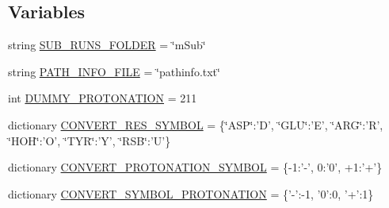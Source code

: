 \subsection*{Variables}
\begin{DoxyCompactItemize}
\item 
string \hyperlink{namespacearg82__conn_a1118fc69bf72cf5c0c6af8860ac1ac98}{S\-U\-B\-\_\-\-R\-U\-N\-S\-\_\-\-F\-O\-L\-D\-E\-R} = \char`\"{}m\-Sub\char`\"{}
\item 
string \hyperlink{namespacearg82__conn_ad6e38f362ded631c94bea165ee760673}{P\-A\-T\-H\-\_\-\-I\-N\-F\-O\-\_\-\-F\-I\-L\-E} = \char`\"{}pathinfo.\-txt\char`\"{}
\item 
int \hyperlink{namespacearg82__conn_a7f9b0ba0df45cb729820b40149d23b2d}{D\-U\-M\-M\-Y\-\_\-\-P\-R\-O\-T\-O\-N\-A\-T\-I\-O\-N} = 211
\item 
dictionary \hyperlink{namespacearg82__conn_ac3320beedaddd48f95e875b543d3a177}{C\-O\-N\-V\-E\-R\-T\-\_\-\-R\-E\-S\-\_\-\-S\-Y\-M\-B\-O\-L} = \{\char`\"{}A\-S\-P\char`\"{}\-:'D', \char`\"{}G\-L\-U\char`\"{}\-:'E', \char`\"{}A\-R\-G\char`\"{}\-:'R', \char`\"{}H\-O\-H\char`\"{}\-:'O', \char`\"{}T\-Y\-R\char`\"{}\-:'Y', \char`\"{}R\-S\-B\char`\"{}\-:'U'\}
\item 
dictionary \hyperlink{namespacearg82__conn_ae79f5cbbaaddf7a4aa3fd0b6d46b2bd2}{C\-O\-N\-V\-E\-R\-T\-\_\-\-P\-R\-O\-T\-O\-N\-A\-T\-I\-O\-N\-\_\-\-S\-Y\-M\-B\-O\-L} = \{-\/1\-:'-\/', 0\-:'0', +1\-:'+'\}
\item 
dictionary \hyperlink{namespacearg82__conn_a34f2a20ec5c6b3f3e697fabc4d5fd6f4}{C\-O\-N\-V\-E\-R\-T\-\_\-\-S\-Y\-M\-B\-O\-L\-\_\-\-P\-R\-O\-T\-O\-N\-A\-T\-I\-O\-N} = \{'-\/'\-:-\/1, '0'\-:0, '+'\-:1\}
\end{DoxyCompactItemize}


